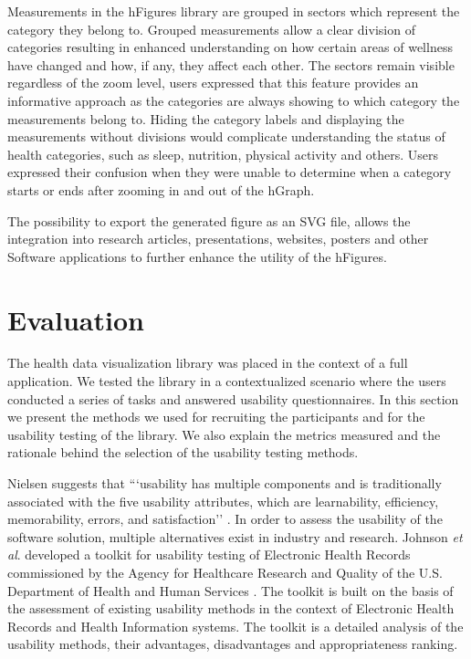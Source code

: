 \documentclass[twocolumn]{bmcart}%
\begin{document}
Measurements in the hFigures library are grouped in sectors which represent the category they belong to. Grouped measurements allow a clear division of categories resulting in enhanced understanding on how certain areas of wellness have changed and how, if any, they affect each other. The sectors remain visible regardless of the zoom level, users expressed that this feature provides an informative approach as the categories are always showing to which category the measurements belong to. Hiding the category labels and displaying the measurements without divisions would complicate understanding the status of health categories, such as sleep, nutrition, physical activity and others. Users expressed their confusion when they were unable to determine when a category starts or ends after zooming in and out of the hGraph.

The possibility to export the generated figure as an SVG file, allows the integration into research articles, presentations, websites, posters and other Software applications to further enhance the utility of the hFigures.

\section*{Evaluation}

The health data visualization library was placed in the context of a full application. We tested the library in a contextualized scenario where the users conducted a series of tasks and answered usability questionnaires. In this section we present the methods we used for recruiting the participants and for the usability testing of the library. We also explain the metrics measured and the rationale behind the selection of the usability testing methods.

Nielsen suggests that ```usability has multiple components and is traditionally associated with the five usability attributes, which are learnability, efficiency, memorability, errors, and satisfaction'' \cite{nielsen1994usability}. In order to assess the usability of the software solution, multiple alternatives exist in industry and research. Johnson \textit{et al}. developed a toolkit for usability testing of Electronic Health Records commissioned by the Agency for Healthcare Research and Quality of the U.S. Department of Health and Human Services \cite{johnson2011ehr}. The toolkit is built on the basis of the assessment of existing usability methods in the context of Electronic Health Records and Health Information systems. The toolkit is a detailed analysis of the usability methods, their advantages, disadvantages and appropriateness ranking.
\end{document}
